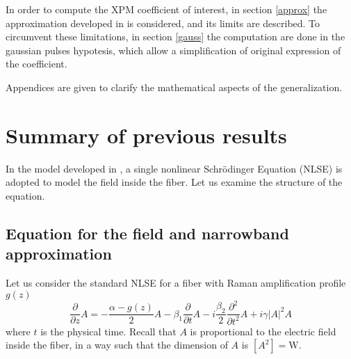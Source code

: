 \documentclass[10pt, lettersize, journal, onecolumn]{IEEEtran}
\begin{document}

In order to compute the XPM coefficient of interest, in section \ref{approx} the approximation developed in \cite{Dar_2013} is considered, and its limits are described.
To circumvent these limitations, in section \ref{gauss} the computation are done in the gaussian pulses hypotesis, which allow a simplification of original expression of the coefficient.

Appendices are given to clarify the mathematical aspects of the generalization.


\section{Summary of previous results}\label{previous}
In the model developed in \cite{Dar_2013}, a single nonlinear Schrödinger Equation (NLSE) is adopted to model the field inside the fiber. Let us examine the structure of the equation.
\subsection{Equation for the field and narrowband approximation}
    Let us consider the standard NLSE for a fiber with Raman amplification profile $g(z)$
    \begin{equation}\label{eq:nlse}
        \frac{\partial}{\partial z} A = -\frac{\alpha - g(z)}{2}A - \beta_1 \frac{\partial}{\partial t} A - i \frac{\beta_2}{2} \frac{\partial^2}{\partial t^2} A + i \gamma |A|^2 A
    \end{equation}
    where $t$ is the physical time. Recall that $A$ is proportional to the electric field inside the fiber, in a way such that the dimension of $A$ is $[A^2] = \text{W}$.
\end{document}
